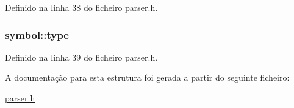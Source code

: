 Definido na linha 38 do ficheiro parser.\-h.

\hypertarget{structsymbol_adba0eaeb4bfbf4787bd3899e4202cc90}{
\subsubsection[{type}]{ symbol\-::type}}\label{structsymbol_adba0eaeb4bfbf4787bd3899e4202cc90}


Definido na linha 39 do ficheiro parser.\-h.



A documentação para esta estrutura foi gerada a partir do seguinte ficheiro\-:\begin{DoxyCompactItemize}
\item 
\hyperlink{parser_8h}{parser.\-h}\end{DoxyCompactItemize}
